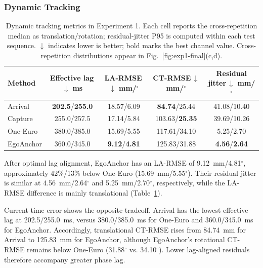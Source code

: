 \documentclass[review]{vgtc}
\begin{document}
\subsubsection{Dynamic Tracking}

\begin{table}[t]
\centering
\caption{Dynamic tracking metrics in Experiment 1. Each cell reports the cross-repetition median as translation/rotation; residual-jitter P95 is computed within each test sequence. $\downarrow$ indicates lower is better; bold marks the best channel value. Cross-repetition distributions appear in Fig.~\ref{fig:exp1-final}(c,d).}
\label{tab:exp1-dynamic}
\setlength{\tabcolsep}{2pt}
\begin{tabular}{@{}lcccc@{}}
\toprule
Method & \shortstack{Effective lag\,$\downarrow$\\ms} & \shortstack{LA-RMSE\,$\downarrow$\\mm/$^\circ$} & \shortstack{CT-RMSE\,$\downarrow$\\mm/$^\circ$} & \shortstack{Residual jitter\,$\downarrow$\\mm/$^\circ$} \\
\midrule
Arrival   & \textbf{202.5}/\textbf{255.0} & 18.57/6.09 & \textbf{84.74}/25.44 & 41.08/10.40 \\
Capture   & 255.0/257.5 & 17.14/5.84 & 103.63/\textbf{25.35} & 39.69/10.26 \\
One-Euro  & 380.0/385.0 & 15.69/5.55 & 117.61/34.10 & 5.25/2.70 \\
EgoAnchor & 360.0/345.0 & \textbf{9.12}/\textbf{4.81} & 125.83/31.88 & \textbf{4.56}/\textbf{2.64} \\
\bottomrule
\end{tabular}
\end{table}

After optimal lag alignment, EgoAnchor has an LA-RMSE of 9.12~mm/4.81$^\circ$, approximately 42\%/13\% below One-Euro (15.69~mm/5.55$^\circ$). Their residual jitter is similar at 4.56~mm/2.64$^\circ$ and 5.25~mm/2.70$^\circ$, respectively, while the LA-RMSE difference is mainly translational (Table~\ref{tab:exp1-dynamic}).

Current-time error shows the opposite tradeoff. Arrival has the lowest effective lag at 202.5/255.0~ms, versus 380.0/385.0~ms for One-Euro and 360.0/345.0~ms for EgoAnchor. Accordingly, translational CT-RMSE rises from 84.74~mm for Arrival to 125.83~mm for EgoAnchor, although EgoAnchor's rotational CT-RMSE remains below One-Euro (31.88$^\circ$ vs. 34.10$^\circ$). Lower lag-aligned residuals therefore accompany greater phase lag.
\end{document}
